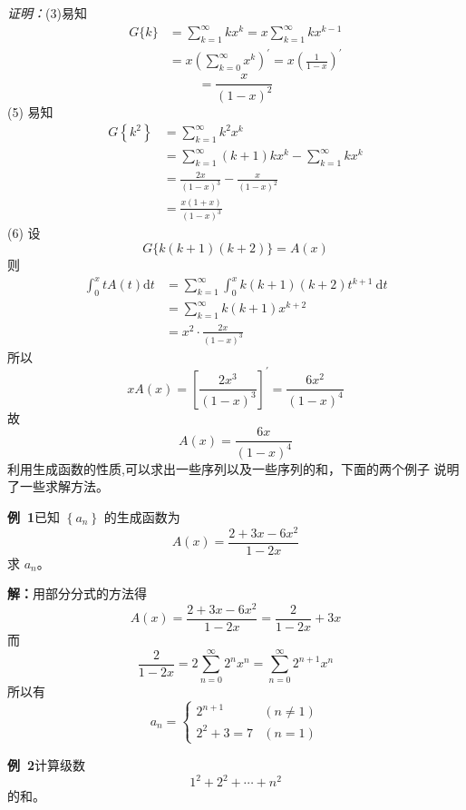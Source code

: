\documentclass{report}
\begin{document}
\textsl{证明：}(3)易知
$$
\begin{aligned}
G\{k\} &=\sum_{k=1}^{\infty} k x^{k}=x \sum_{k=1}^{\infty} k x^{k-1} \\
&=x\left(\sum_{k=0}^{\infty} x^{k}\right)^{\prime}=x\left(\frac{1}{1-x}\right)^{\prime}
\end{aligned}
$$
$$
=\frac{x}{(1-x)^{2}}
$$
(5) 易知
$$
\begin{aligned}
G\left\{k^{2}\right\} &=\sum_{k=1}^{\infty} k^{2} x^{k} \\
&=\sum_{k=1}^{\infty}(k+1) k x^{k}-\sum_{k=1}^{\infty} k x^{k} \\
&=\frac{2 x}{(1-x)^{3}}-\frac{x}{(1-x)^{2}} \\
&=\frac{x(1+x)}{(1-x)^{3}}
\end{aligned}
$$
(6) 设
$$
G\{k(k+1)(k+2)\}=A(x)
$$
则
$$
\begin{aligned}
\int_{0}^{x} t A(t) \mathrm{d} t &=\sum_{k=1}^{\infty} \int_{0}^{x} k(k+1)(k+2) t^{k+1} \mathrm{~d} t \\
&=\sum_{k=1}^{\infty} k(k+1) x^{k+2} \\
&=x^{2} \cdot \frac{2 x}{(1-x)^{3}}
\end{aligned}
$$
所以
$$
x A(x)=\left[\frac{2 x^{3}}{(1-x)^{3}}\right]^{\prime}=\frac{6 x^{2}}{(1-x)^{4}}
$$
故
$$
A(x)=\frac{6 x}{(1-x)^{4}}
$$
利用生成函数的性质,可以求出一些序列以及一些序列的和，下面的两个例子 说明了一些求解方法。

\noindent
\textbf{例\ 1}已知 $\left\{a_{n}\right\}$ 的生成函数为
$$
A(x)=\frac{2+3 x-6 x^{2}}{1-2 x}
$$
求 $a_{n}$。

\textbf{解：}用部分分式的方法得
$$
A(x)=\frac{2+3 x-6 x^{2}}{1-2 x}=\frac{2}{1-2 x}+3 x
$$
而
$$
\frac{2}{1-2 x}=2 \sum_{n=0}^{\infty} 2^{n} x^{n}=\sum_{n=0}^{\infty} 2^{n+1} x^{n}
$$
所以有
$$
a_{n}=\left\{\begin{array}{ll}
2^{n+1} & (n \neq 1) \\
2^{2}+3=7 & (n=1)
\end{array}\right.
$$

\textbf{例\ 2}计算级数
$$
1^{2}+2^{2}+\cdots+n^{2}
$$
的和。
\end{document}
